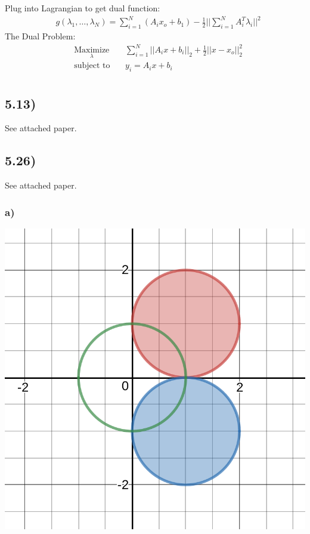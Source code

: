 \documentclass[12pt]{article}
\begin{document}
Plug into Lagrangian to get dual function:
\begin{equation*}
\begin{aligned}
& g(\lambda_1, \dots, \lambda_N) = \sum_{i=1}^{N}(A_ix_o + b_1)- \frac{1}{2}||\sum_{i=1}^{N}A_i^T\lambda_i||^2
\end{aligned}
\end{equation*}
The Dual Problem:
\begin{equation*}
\begin{aligned}
& \underset{\lambda}{\text{Maximize}}
& & \sum_{i=1}^{N}||A_ix+b_i||_2 + \frac{1}{2}||x-x_o||_2^2\\
& \text{subject to}\
& & y_i = A_ix+b_i\\
\end{aligned}
\end{equation*}
 
\subsection*{5.13)}
See attached paper.

\subsection*{5.26)}
See attached paper.
\subsubsection*{a)}
\includegraphics[scale=.25]{26a.png}
\end{document}
